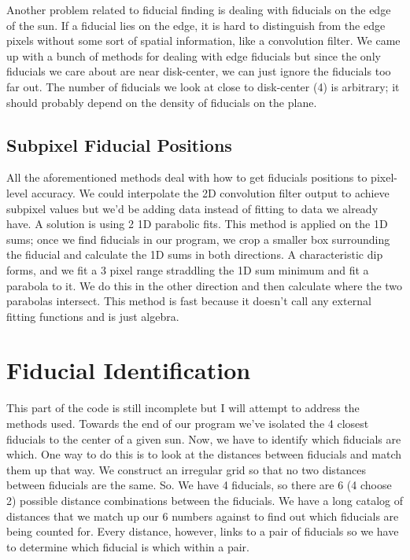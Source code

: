 \documentclass[10pt]{scrartcl}
\begin{document}
Another problem related to fiducial finding is dealing with fiducials on the edge of the sun. If a fiducial lies on the edge, it is hard to distinguish from the edge pixels without some sort of spatial information, like a convolution filter. We came up with a bunch of methods for dealing with edge fiducials but since the only fiducials we care about are near disk-center, we can just ignore the fiducials too far out. The number of fiducials we look at close to disk-center (4) is arbitrary; it should probably depend on the density of fiducials on the plane. 

\subsection{Subpixel Fiducial Positions} %
\label{sub:subpixel_fiducial_positions}
All the aforementioned methods deal with how to get fiducials positions to pixel-level accuracy. We could interpolate the 2D convolution filter output to achieve subpixel values but we'd be adding data instead of fitting to data we already have. A solution is using 2 1D parabolic fits. This method is applied on the 1D sums; once we find fiducials in our program, we crop a smaller box surrounding the fiducial and calculate the 1D sums in both directions. A characteristic dip forms, and we fit a 3 pixel range straddling the 1D sum minimum and fit a parabola to it. We do this in the other direction and then calculate where the two parabolas intersect. This method is fast because it doesn't call any external fitting functions and is just algebra.  


\section{Fiducial Identification} %
\label{sec:fiducial_identification}
This part of the code is still incomplete but I will attempt to address the methods used. Towards the end of our program we've isolated the 4 closest fiducials to the center of a given sun. Now, we have to identify which fiducials are which. One way to do this is to look at the distances between fiducials and match them up that way. We construct an irregular grid so that no two distances between fiducials are the same. So. We have 4 fiducials, so there are 6 (4 choose 2) possible distance combinations between the fiducials. We have a long catalog of distances that we match up our 6 numbers against to find out which fiducials are being counted for. Every distance, however, links to a pair of fiducials so we have to determine which fiducial is which within a pair. 
\end{document}
